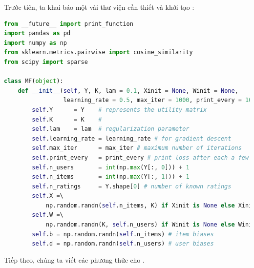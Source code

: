 Trước tiên, ta khai báo một vài thư viện cần thiết và khởi tạo
:
\begin{lstlisting}[language=Python]
from __future__ import print_function 
import pandas as pd 
import numpy as np
from sklearn.metrics.pairwise import cosine_similarity
from scipy import sparse 

class MF(object):
    def __init__(self, Y, K, lam = 0.1, Xinit = None, Winit = None, 
                 learning_rate = 0.5, max_iter = 1000, print_every = 100):
        self.Y      = Y    # represents the utility matrix 
        self.K      = K    # 
        self.lam    = lam  # regularization parameter 
        self.learning_rate = learning_rate # for gradient descent 
        self.max_iter      = max_iter # maximum number of iterations 
        self.print_every   = print_every # print loss after each a few iters 
        self.n_users       = int(np.max(Y[:, 0])) + 1 
        self.n_items       = int(np.max(Y[:, 1])) + 1
        self.n_ratings     = Y.shape[0] # number of known ratings
        self.X =\ 
            np.random.randn(self.n_items, K) if Xinit is None else Xinit 
        self.W =\ 
            np.random.randn(K, self.n_users) if Winit is None else Winit 
        self.b = np.random.randn(self.n_items) # item biases
        self.d = np.random.randn(self.n_users) # user biases
\end{lstlisting} 
Tiếp theo, chúng ta viết các phương thức
 cho . 
